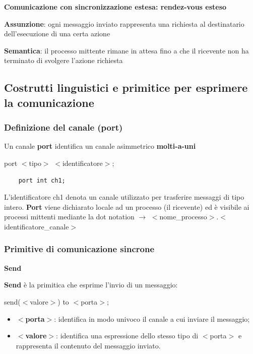 \documentclass{article}
\begin{document}
\vspace{5mm}
\textbf{Comunicazione con sincronizzazione estesa: rendez-vous esteso}

\textbf{Assunzione}: ogni messaggio inviato rappresenta una richiesta al destinatario dell'esecuzione di una certa azione

\textbf{Semantica}: il processo mittente rimane in attesa fino a che il ricevente non ha terminato di svolgere l'azione richiesta


\subsection{Costrutti linguistici e primitice per esprimere la comunicazione}
\subsubsection{Definizione del canale (port)}

Un canale \textbf{port} identifica un canale asimmetrico \textbf{molti-a-uni}

port $<$tipo$>$ $<$identificatore$>$;

\begin{lstlisting}
    port int ch1;
\end{lstlisting}

L'identificatore ch1 denota un canale utilizzato per trasferire messaggi di tipo intero. \textbf{Port} viene dichiarato locale ad un processo (il ricevente) ed è visibile ai
processi mittenti mediante la dot notation $\rightarrow$ $<$nome_processo$>$.$<$identificatore_canale$>$

\subsubsection{Primitive di comunicazione sincrone}

\textbf{Send}
\vspace{3mm}

\textbf{Send} è la primitica che esprime l'invio di un messaggio:
\begin{center}
    send($<$valore$>$) to $<$porta$>$;
\end{center}

\begin{itemize}
    \item \textbf{$<$porta$>$}: identifica in modo univoco il canale a cui inviare il messaggio;
    \item \textbf{$<$valore$>$}: identifica una espressione dello stesso tipo di $<$porta$>$ e rappresenta il contenuto del messaggio inviato.
\end{itemize}
\end{document}
